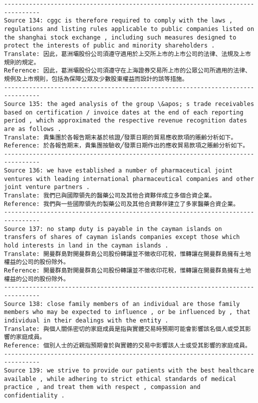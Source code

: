 \documentclass[11pt]{article}
\begin{document}
\begin{Verbatim}[commandchars=\\\{\}]
--------------------------------------------------------------------------------
Source 134: cggc is therefore required to comply with the laws , regulations and listing rules applicable to public companies listed on the shanghai stock exchange , including such measures designed to protect the interests of public and minority shareholders .
Translate: 因此，葛洲壩股份公司須遵守適用於上交所上市的上市公司的法律、法規及上市規則的規定。
Reference: 因此，葛洲壩股份公司須遵守在上海證券交易所上市的公眾公司所適用的法律、規例及上市規則，包括為保障公眾及少數股東權益而設計的該等措施。
--------------------------------------------------------------------------------
Source 135: the aged analysis of the group \&apos; s trade receivables based on certification / invoice dates at the end of each reporting period , which approximated the respective revenue recognition dates are as follows .
Translate: 貴集團於各報告期末基於核證╱發票日期的貿易應收款項的賬齡分析如下。
Reference: 於各報告期末，貴集團按驗收╱發票日期作出的應收貿易款項之賬齡分析如下。
--------------------------------------------------------------------------------
Source 136: we have established a number of pharmaceutical joint ventures with leading international pharmaceutical companies and other joint venture partners .
Translate: 我們已與國際領先的醫藥公司及其他合資夥伴成立多個合資企業。
Reference: 我們與一些國際領先的製藥公司及其他合資夥伴建立了多家醫藥合資企業。
--------------------------------------------------------------------------------
Source 137: no stamp duty is payable in the cayman islands on transfers of shares of cayman islands companies except those which hold interests in land in the cayman islands .
Translate: 開曼群島對開曼群島公司股份轉讓並不徵收印花稅，惟轉讓在開曼群島擁有土地權益的公司的股份除外。
Reference: 開曼群島對開曼群島公司股份轉讓並不徵收印花稅，惟轉讓在開曼群島擁有土地權益的公司的股份除外。
--------------------------------------------------------------------------------
Source 138: close family members of an individual are those family members who may be expected to influence , or be influenced by , that individual in their dealings with the entity .
Translate: 與個人關係密切的家庭成員是指與實體交易時預期可能會影響該名個人或受其影響的家庭成員。
Reference: 個別人士的近親指預期會於與實體的交易中影響該人士或受其影響的家庭成員。
--------------------------------------------------------------------------------
Source 139: we strive to provide our patients with the best healthcare available , while adhering to strict ethical standards of medical practice , and treat them with respect , compassion and confidentiality .

\end{Verbatim}
\end{document}
